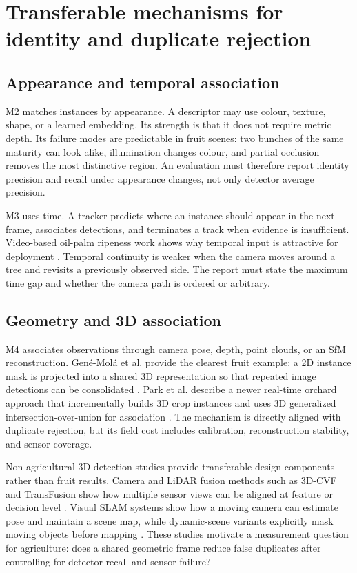 \section{Transferable mechanisms for identity and duplicate rejection}
\label{sec:transfer2}

\subsection{Appearance and temporal association}

M2 matches instances by appearance. A descriptor may use colour, texture, shape, or a learned embedding. Its strength is that it does not require metric depth. Its failure modes are predictable in fruit scenes: two bunches of the same maturity can look alike, illumination changes colour, and partial occlusion removes the most distinctive region. An evaluation must therefore report identity precision and recall under appearance changes, not only detector average precision.

M3 uses time. A tracker predicts where an instance should appear in the next frame, associates detections, and terminates a track when evidence is insufficient. Video-based oil-palm ripeness work shows why temporal input is attractive for deployment \cite{junior2023videopalm}. Temporal continuity is weaker when the camera moves around a tree and revisits a previously observed side. The report must state the maximum time gap and whether the camera path is ordered or arbitrary.

\subsection{Geometry and 3D association}

M4 associates observations through camera pose, depth, point clouds, or an SfM reconstruction. Gené-Molá et al. provide the clearest fruit example: a 2D instance mask is projected into a shared 3D representation so that repeated image detections can be consolidated \cite{genemola2020fruit3d}. Park et al. describe a newer real-time orchard approach that incrementally builds 3D crop instances and uses 3D generalized intersection-over-union for association \cite{park2026cropassociation}. The mechanism is directly aligned with duplicate rejection, but its field cost includes calibration, reconstruction stability, and sensor coverage.

Non-agricultural 3D detection studies provide transferable design components rather than fruit results. Camera and LiDAR fusion methods such as 3D-CVF and TransFusion show how multiple sensor views can be aligned at feature or decision level \cite{yoo20203dcvf,bai2022transfusion}. Visual SLAM systems show how a moving camera can estimate pose and maintain a scene map, while dynamic-scene variants explicitly mask moving objects before mapping \cite{bescos2018dynaslam}. These studies motivate a measurement question for agriculture: does a shared geometric frame reduce false duplicates after controlling for detector recall and sensor failure?

